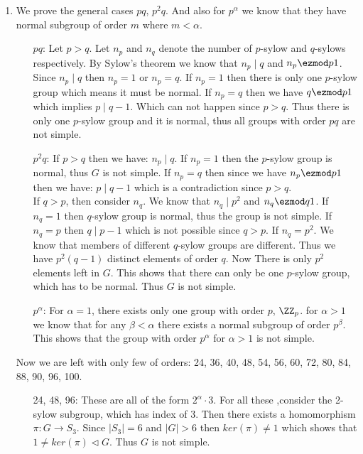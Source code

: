 \begin{enumerate}[label=]
    \item
        We prove the general cases $pq$, $p^2q$. And also for $p^\alpha$ we know that they have normal subgroup of order $m$ where $m < \alpha$.
        \begin{itemize}
            \item[$pq$:] Let $p > q$. Let $n_p$ and $n_q$ denote the number of $p$-sylow and $q$-sylows respectively. By Sylow's theorem we know that $n_p \mid q$ and $n_p \ezmod p 1$. Since $n_p \mid q$ then $n_p = 1$ or $n_p = q$. If $n_p = 1$ then there is only one $p$-sylow group which means it must be normal. If $n_p = q$ then we have $q \ezmod p 1$ which implies $p \mid q - 1$. Which can not happen since $p > q$. Thus there is only one $p$-sylow group and it is normal, thus all groups with order $pq$ are not simple.
            
            \item[$p^2q$:] If $p > q$ then we have: $n_p \mid q$. If $n_p = 1$ then the $p$-sylow group is normal, thus $G$ is not simple. If $n_p = q$ then since we have $n_p \ezmod p 1$ then we have: $p \mid q - 1$ which is a contradiction since $p > q$. \\
            If $q > p$, then consider $n_q$. We know that $n_q \mid p^2$ and $n_q \ezmod q 1$. If $n_q = 1$ then $q$-sylow group is normal, thus the group is not simple. If $n_q = p$ then $q \mid p - 1$ which is not possible since $q > p$.
            If $n_q = p^2$. We know that members of different $q$-sylow groups are different. Thus we have $p^2 (q - 1)$ distinct elements of order $q$. Now There is only $p^2$ elements left in $G$. This shows that there can only be one $p$-sylow group, which has to be normal. Thus $G$ is not simple.

            \item[$p^\alpha$:] For $\alpha = 1$, there exists only one group with order $p$, $\ZZ_p$. for $\alpha > 1$ we know that for any $\beta < \alpha$ there exists a normal subgroup of order $p^\beta$. This shows that the group with order $p^\alpha$ for $\alpha > 1$ is not simple. 
        \end{itemize}
        Now we are left with only few of orders: 24, 36, 40, 48, 54, 56, 60, 72, 80, 84, 88, 90, 96, 100.

        \begin{itemize}
            \item[24, 48, 96:] These are all of the form $2^\alpha \cdot 3$. For all these ,consider the 2-sylow subgroup, which has index of 3. Then there exists a homomorphism $\pi: G \to S_3$. Since $|S_3| = 6$ and $|G| > 6$ then $ker(\pi) \ne 1$ which shows that $1 \ne ker(\pi) \vartriangleleft G$. Thus $G$ is not simple.
            

\end{itemize}
\end{enumerate}
